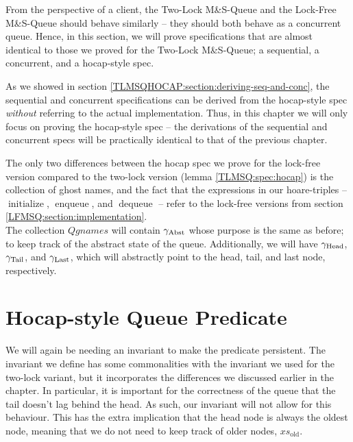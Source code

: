 \documentclass[a4paper, 10pt]{report}
\theoremstyle{definition}
\newcommand{\initialise}{\operatorname{initialize}}
\newcommand{\enqueue}{\operatorname{enqueue}}
\newcommand{\dequeue}{\operatorname{dequeue}}
\newcommand{\msq}{M\&S-Queue\xspace}
\newcommand{\tlmsq}{Two-Lock \msq}
\newcommand{\lfmsq}{Lock-Free \msq}
\newcommand{\Qgnames}{Qgnames}
\newcommand{\xsold}{xs_{\mathrm{old}}}
\newcommand{\gabst}{\gname_{\mathrm{Abst}}}
\newcommand{\ghead}{\gname_{\mathrm{Head}}}
\newcommand{\gtail}{\gname_{\mathrm{Tail}}}
\newcommand{\glast}{\gname_{\mathrm{Last}}}
\begin{document}
From the perspective of a client, the \tlmsq and the \lfmsq should behave similarly -- they should both behave as a concurrent queue. Hence, in this section, we will prove specifications that are almost identical to those we proved for the \tlmsq; a sequential, a concurrent, and a hocap-style spec.

As we showed in section \ref{TLMSQHOCAP:section:deriving-seq-and-conc}, the sequential and concurrent specifications can be derived from the hocap-style spec \emph{without} referring to the actual implementation. Thus, in this chapter we will only focus on proving the hocap-style spec -- the derivations of the sequential and concurrent specs will be practically identical to that of the previous chapter.

The only two differences between the hocap spec we prove for the lock-free version compared to the two-lock version (lemma \ref{TLMSQ:spec:hocap}) is the collection of ghost names, and the fact that the expressions in our hoare-triples -- $\initialise$, $\enqueue$, and $\dequeue$ -- refer to the lock-free versions from section \ref{LFMSQ:section:implementation}.\\
The collection $\Qgnames$ will contain $\gabst$ whose purpose is the same as before; to keep track of the abstract state of the queue. Additionally, we will have $\ghead$, $\gtail$, and $\glast$, which will abstractly point to the head, tail, and last node, respectively. 

\section{Hocap-style Queue Predicate}
\label{LFMSQ:section:hocap-queue-pred}

We will again be needing an invariant to make the predicate persistent. The invariant we define has some commonalities with the invariant we used for the two-lock variant, but it incorporates the differences we discussed earlier in the chapter. In particular, it is important for the correctness of the queue that the tail doesn't lag behind the head. As such, our invariant will not allow for this behaviour. This has the extra implication that the head node is always the oldest node, meaning that we do not need to keep track of older nodes, $\xsold$.
\end{document}
